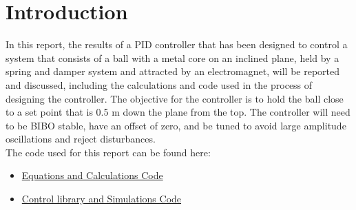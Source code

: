 \section*{Introduction}
In this report, the results of a PID controller that has been designed to control a system that consists of a ball with a metal core on an inclined plane, held by a spring and damper system and attracted by an electromagnet, will be reported and discussed, including the calculations and code used in the process of designing the controller.
The objective for the controller is to hold the ball close to a set point that is 0.5 m down the plane from the top. The controller will need to be BIBO stable, have an offset of zero, and be tuned to avoid large amplitude oscillations and reject disturbances.
\\
The code used for this report can be found here:
\begin{itemize}
  \item \href{https://github.com/40327859/ELE2038-Control-Coursework-Group-13/blob/main/Group13_sympy.ipynb}{Equations and Calculations Code}
  \item \href{https://github.com/40327859/ELE2038-Control-Coursework-Group-13/blob/main/Group13_simulations.ipynb}{Control library and Simulations Code}
\end{itemize}

